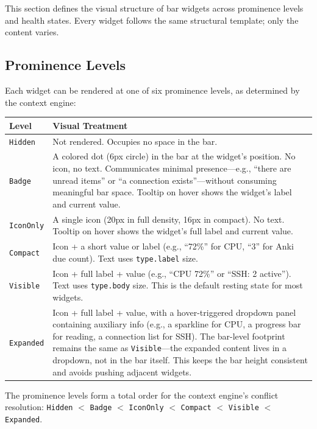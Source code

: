 \documentclass[11pt,a4paper]{article}
\begin{document}
This section defines the visual structure of bar widgets across prominence levels and health states. Every widget follows the same structural template; only the content varies.

\subsection{Prominence Levels}

Each widget can be rendered at one of six prominence levels, as determined by the context engine:

\begin{longtable}{p{2.5cm} p{11cm}}
\toprule
\textbf{Level} & \textbf{Visual Treatment} \\
\midrule
\texttt{Hidden} & Not rendered. Occupies no space in the bar. \\
\addlinespace
\texttt{Badge} & A colored dot (6px circle) in the bar at the widget's position. No icon, no text. Communicates minimal presence---e.g., ``there are unread items'' or ``a connection exists''---without consuming meaningful bar space. Tooltip on hover shows the widget's label and current value. \\
\addlinespace
\texttt{IconOnly} & A single icon (20px in full density, 16px in compact). No text. Tooltip on hover shows the widget's full label and current value. \\
\addlinespace
\texttt{Compact} & Icon + a short value or label (e.g., ``72\%'' for CPU, ``3'' for Anki due count). Text uses \texttt{type.label} size. \\
\addlinespace
\texttt{Visible} & Icon + full label + value (e.g., ``CPU 72\%'' or ``SSH: 2 active''). Text uses \texttt{type.body} size. This is the default resting state for most widgets. \\
\addlinespace
\texttt{Expanded} & Icon + full label + value, with a hover-triggered dropdown panel containing auxiliary info (e.g., a sparkline for CPU, a progress bar for reading, a connection list for SSH). The bar-level footprint remains the same as \texttt{Visible}---the expanded content lives in a dropdown, not in the bar itself. This keeps the bar height consistent and avoids pushing adjacent widgets. \\
\bottomrule
\end{longtable}

The prominence levels form a total order for the context engine's conflict resolution: \texttt{Hidden} $<$ \texttt{Badge} $<$ \texttt{IconOnly} $<$ \texttt{Compact} $<$ \texttt{Visible} $<$ \texttt{Expanded}.
\end{document}
